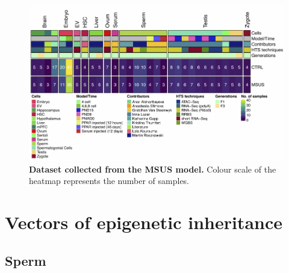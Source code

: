 \documentclass[12pt,twoside]{reedthesis}
\begin{document}
\begin{figure}[htbp]

{\centering \includegraphics{thesis_files/figure-latex/if5-1} 

}

\caption[Dataset collected from the MSUS model]{\textbf{Dataset collected from the MSUS model.} Colour scale
of the heatmap represents the number of samples.}\label{fig:if5}
\end{figure}
\hypertarget{vectors-of-epigenetic-inheritance}{%
\section*{Vectors of epigenetic inheritance}\label{vectors-of-epigenetic-inheritance}}

\hypertarget{sperm}{%
\subsection*{Sperm}\label{sperm}}
\end{document}
